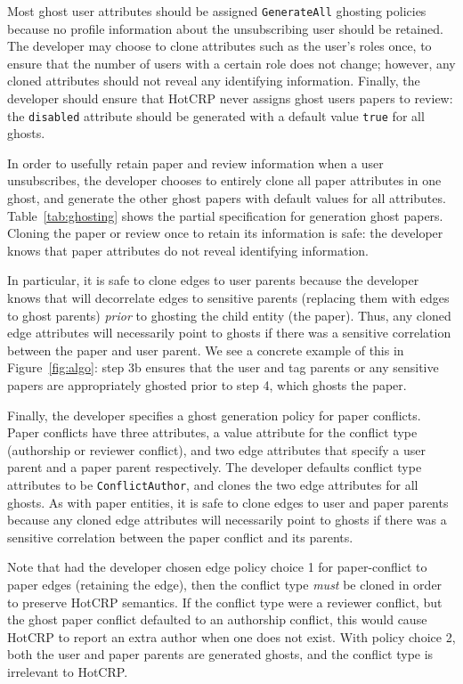 Most ghost user attributes should be assigned \texttt{GenerateAll} ghosting policies because no
profile information about the unsubscribing user should be retained. The developer may choose to
clone attributes such as the user's roles once, to ensure that the number of users with a certain
role does not change; however, any cloned attributes should not reveal any identifying information.
Finally, the developer should ensure that HotCRP never assigns ghost users papers to review: the
\texttt{disabled} attribute should be generated with a default value \texttt{true} for all ghosts.

In order to usefully retain paper and review information when a user unsubscribes, the developer chooses to
entirely clone all paper attributes in one ghost, and generate the other ghost papers with default
values for all attributes. Table~\ref{tab:ghosting} shows the partial specification for generation
ghost papers. Cloning the paper or review once to retain its information is safe: the developer knows that
paper attributes do not reveal identifying information.

In particular, it is safe to clone edges to user parents because the developer knows that \sys will
decorrelate edges to sensitive parents (replacing them with edges to ghost parents) \emph{prior} to
ghosting the child entity (the paper). Thus, any cloned edge attributes will necessarily point to
ghosts if there was a sensitive correlation between the paper and user parent.  We see a concrete
example of this in Figure~\ref{fig:algo}: step 3b ensures that the user and tag parents or any
sensitive papers are appropriately ghosted prior to step 4, which ghosts the paper.

Finally, the developer specifies a ghost generation policy for paper conflicts. Paper conflicts have three attributes,
a value attribute for the conflict type (authorship or reviewer conflict), and two edge attributes
that specify a user parent and a paper parent respectively. The developer defaults conflict type
attributes to be \texttt{ConflictAuthor}, and clones the two edge attributes for all ghosts.
As with paper entities, it is safe to clone edges to user and paper parents because any cloned edge
attributes will necessarily point to ghosts if there was a sensitive correlation between the paper
conflict and its parents. 

Note that had the developer chosen edge policy choice 1 for paper-conflict to paper edges
(retaining the edge), then the conflict type \emph{must} be cloned in order to preserve HotCRP
semantics. If the conflict type were a reviewer conflict, but the ghost paper conflict defaulted to an
authorship conflict, this would cause HotCRP to report an extra author when one does not exist.
With policy choice 2, both the user and paper parents are generated ghosts, and the conflict type is
irrelevant to HotCRP.

